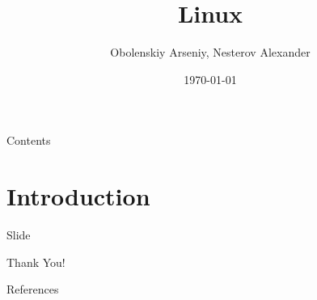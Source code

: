 \documentclass{beamer}
\title[Linux]{Linux}
\author{Obolenskiy Arseniy, Nesterov Alexander}
\institute{ITLab}
\date{\today}
\begin{document}
\begin{frame}
    \titlepage
\end{frame}

\begin{frame}{Contents}
    \tableofcontents
\end{frame}

\section{Introduction}

\begin{frame}{Slide}
\end{frame}

\begin{frame}
    \centering
    \Huge{Thank You!}
\end{frame}

\begin{frame}{References}
\end{frame}
\end{document}
